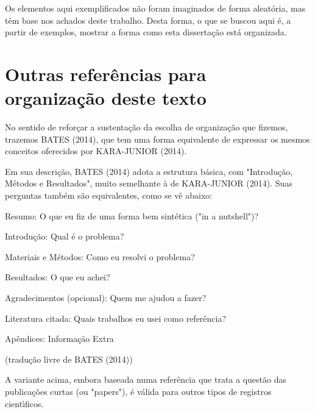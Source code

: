 \documentclass[
12pt,		%
openright,	%
twoside,  %
a4paper,			%
chapter=TITLE,		%
english,			%
french,				%
spanish,			%
brazil				%
]{USPSC-classe/USPSC}
\begin{document}
Os elementos aqui exemplificados n\~ao foram imaginados de forma aleat\'oria, mas t\^em base nos achados deste trabalho. Desta forma, o que se buscou aqui \'e, a partir de exemplos, mostrar a forma como esta disserta\c{c}\~ao est\'a organizada.


\section[Outras refer\^encias para organiza\c{c}\~ao deste texto]{Outras refer\^encias para organiza\c{c}\~ao deste texto}\label{Outras refer\^encias para organiza\c{c}\~ao deste texto}
No sentido de refor\c{c}ar a sustenta\c{c}\~ao da escolha de organiza\c{c}\~ao que fizemos, trazemos  BATES (2014), que tem uma forma equivalente de expressar os mesmos conceitos oferecidos por  KARA-JUNIOR (2014).


Em sua descri\c{c}\~ao, BATES (2014)  adota a estrutura b\'asica, com "Introdu\c{c}\~ao, M\'etodos e Resultados", muito semelhante \`a de KARA-JUNIOR (2014). Suas perguntas tamb\'em s\~ao equivalentes, como se v\^e abaixo:



\begin{alineas}
\item Resumo: O que eu fiz de uma forma bem sint\'etica ("in a nutshell")?
\item Introdu\c{c}\~ao: Qual \'e o problema?
\item Materiais e M\'etodos: Como eu resolvi o problema?
\item Resultados: O que eu achei?
\item Agradecimentos (opcional): Quem me ajudou a fazer?
\item Literatura citada: Quais trabalhos eu usei como refer\^encia?
\item Ap\^endices: Informa\c{c}\~ao Extra
\end{alineas}

\begin{flushright}
\setlength{\absparsep}{0pt}
\tiny \begin{flushright}
\setlength{\absparsep}{0pt}
\tiny (tradu\c{c}\~ao livre de BATES (2014)) \normalsize 
\end{flushright}

 \normalsize 
\end{flushright}


A variante acima, embora baseada numa refer\^encia que trata a quest\~ao das publica\c{c}\~oes curtas (ou "papers"), \'e v\'alida para outros tipos de registros cient\'{\i}ficos.
\end{document}

